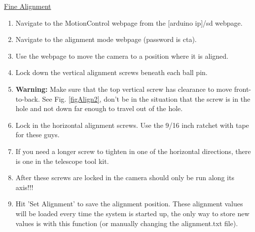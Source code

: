 \documentclass[11pt]{article}
\begin{document}
\underline{Fine Alignment}
\begin{enumerate}
	\item Navigate to the MotionControl webpage from the [arduino ip]/sd webpage.
	\item Navigate to the alignment mode webpage (password is cta).
	\item Use the webpage to move the camera to a position where it is aligned.
	\item Lock down the vertical alignment screws beneath each ball pin.  
	\item {\bf Warning: } Make sure that the top vertical screw has clearance to move front-to-back.  
		See Fig. \ref{figAlign2}, don't be in the situation that the screw is in the hole and not down far enough to travel out of the hole.
	\item Lock in the horizontal alignment screws. 
		Use the 9/16 inch ratchet with tape for these guys.
	\item If you need a longer screw to tighten in one of the horizontal directions, there is one in the telescope tool kit.
	\item After these screws are locked in the camera should only be run along its axis!!!
	\item Hit 'Set Alignment' to save the alignment position.  These alignment values will be loaded every time the system is started up, the only way to store new values is with this function (or manually changing the alignment.txt file).
\end{enumerate}
\end{document}
